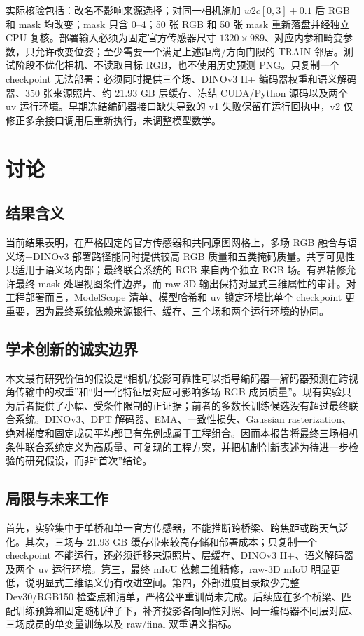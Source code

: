 \documentclass[UTF8,a4paper,11pt]{ctexart}
\begin{document}
实际核验包括：改名不影响来源选择；对同一相机施加 $w2c[0,3]+0.1$ 后 RGB 和 mask 均改变；mask 只含 0--4；50 张 RGB 和 50 张 mask 重新落盘并经独立 CPU 复核。部署输入必须为固定官方传感器尺寸 $1320\times989$、对应内参和畸变参数，只允许改变位姿；至少需要一个满足上述距离/方向门限的 TRAIN 邻居。测试阶段不优化相机、不读取目标 RGB，也不使用历史预测 PNG。只复制一个 checkpoint 无法部署：必须同时提供三个场、DINOv3 H+ 编码器权重和语义解码器、350 张来源照片、约 21.93 GB 层缓存、冻结 CUDA/Python 源码以及两个 uv 运行环境。早期冻结编码器接口缺失导致的 v1 失败保留在运行回执中，v2 仅修正多余接口调用后重新执行，未调整模型数学。

\section{讨论}
\subsection{结果含义}
当前结果表明，在严格固定的官方传感器和共同原图网格上，多场 RGB 融合与语义场+DINOv3 部署路径能同时提供较高 RGB 质量和五类掩码质量。共享可见性只适用于语义场内部；最终联合系统的 RGB 来自两个独立 RGB 场。有界精修允许最终 mask 处理视图条件边界，而 raw-3D 输出保持对显式三维属性的审计。对工程部署而言，ModelScope 清单、模型哈希和 uv 锁定环境比单个 checkpoint 更重要，因为最终系统依赖来源银行、缓存、三个场和两个运行环境的协同。

\subsection{学术创新的诚实边界}
本文最有研究价值的假设是“相机/投影可靠性可以指导编码器—解码器预测在跨视角传输中的权重”和“归一化特征层对应可影响多场 RGB 成员质量”。现有实验只为后者提供了小幅、受条件限制的正证据；前者的多数长训练候选没有超过最终联合系统。DINOv3、DPT 解码器、EMA、一致性损失、Gaussian rasterization、绝对梯度和固定成员平均都已有先例或属于工程组合。因而本报告将最终三场相机条件联合系统定义为高质量、可复现的工程方案，并把机制创新表述为待进一步检验的研究假设，而非“首次”结论。

\subsection{局限与未来工作}
首先，实验集中于单桥和单一官方传感器，不能推断跨桥梁、跨焦距或跨天气泛化。其次，三场与 21.93 GB 缓存带来较高存储和部署成本；只复制一个 checkpoint 不能运行，还必须迁移来源照片、层缓存、DINOv3 H+、语义解码器及两个 uv 运行环境。第三，最终 mIoU 依赖二维精修，raw-3D mIoU 明显更低，说明显式三维语义仍有改进空间。第四，外部进度目录缺少完整 Dev30/RGB150 检查点和清单，严格公平重训尚未完成。后续应在多个桥梁、匹配训练预算和固定随机种子下，补齐投影各向同性对照、同一编码器不同层对应、三场成员的单变量训练以及 raw/final 双重语义指标。
\end{document}
